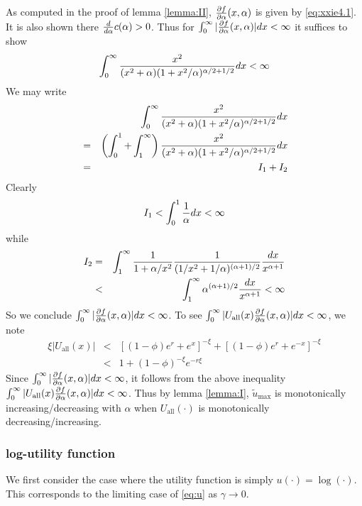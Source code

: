 \documentclass[11pt,a4]{amsart}
\newcommand{\pd}{\partial}
\newcommand{\wt}{\widetilde}
\newcommand{\1}{{\mathbf 1}}
\begin{document}
As computed in the proof of lemma \ref{lemma:II}, ${\pd f \over \pd
  \alpha}(x, \alpha)$ is given by \eqref{eq:xxie4.1}. It is also shown
there ${d \over d \alpha} c(\alpha) > 0$. Thus for
$\int_0^\infty |{\pd f \over \pd \alpha}(x, \alpha)| dx < \infty$
it suffices to show
\[
\int_ 0^\infty {
x^2
\over
(x^2 + \alpha) (1 + x^2 / \alpha)^{\alpha/2 + 1/2}
} dx < \infty
\]
We may write
\begin{eqnarray*}
&& \int_ 0^\infty {
x^2
\over
(x^2 + \alpha) (1 + x^2 / \alpha)^{\alpha/2 + 1/2}
} dx \\
&=& \left(\int_0^1 + \int_1^\infty \right) {
x^2
\over
(x^2 + \alpha) (1 + x^2 / \alpha)^{\alpha/2 + 1/2}
} dx \\
&=& I_1 + I_2
\end{eqnarray*}
Clearly
\[
I_1 < \int_0^1 {1 \over \alpha} dx < \infty
\]
while
\begin{eqnarray*}
  I_2 &=& \int_1^\infty {1 \over 1 + \alpha/x^2}
  {1 \over (1/x^2 + 1/\alpha)^{(\alpha+1) / 2}} {dx \over x^{\alpha +
      1}} \\
  &<& \int_1^\infty \alpha^{(\alpha+1) / 2} {dx \over x^{\alpha + 1}}
  < \infty
\end{eqnarray*}
So we conclude
$\int_0^\infty |{\pd f \over \pd \alpha}(x, \alpha)| dx < \infty$.
To see
$\int_0^\infty |U_{\text{all}}(x){\pd f \over \pd \alpha}(x, \alpha)| dx < \infty$, we note
\begin{eqnarray*}
  \xi |U_{\text{all}}(x)|
  &<& [(1 - \phi) e^r + e^x]^{-\xi} + [(1 - \phi) e^r + e^{-x}]^{-\xi} \\
  &<& 1 + (1 - \phi)^{-\xi} e^{-r \xi}
\end{eqnarray*}
Since $\int_0^\infty |{\pd f \over \pd \alpha}(x, \alpha)| dx < \infty$,
it follows from the above inequality $\int_0^\infty |U_{\text{all}}(x){\pd f \over \pd \alpha}(x, \alpha)| dx < \infty$.
Thus by lemma \ref{lemma:I}, $\wt u_{\text{max}}$ is monotonically
increasing/decreasing with $\alpha$ when $U_{\text{all}}(\cdot)$ is
monotonically decreasing/increasing.

\subsubsection{log-utility function}
We first consider the case where the utility function is simply
$u(\cdot) = \log(\cdot)$. This corresponds to the limiting case of
\eqref{eq:u} as $\gamma \to 0$.
\end{document}
